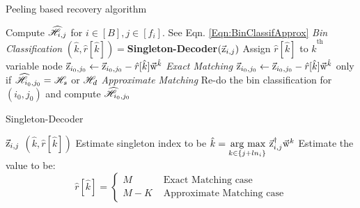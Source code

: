\documentclass[journal,11pt,onecolumn]{IEEEtran}  %
\begin{document}
\def\gap{4pt}
\begin{algorithm}[h!]
\caption{Peeling based recovery algorithm}
\label{Algo:decoder}
\begin{algorithmic}
\State Compute $\widehat{\mathscr{H}}_{i,j}$ for $i\in[B], j\in[f_i]$. See Eqn. \eqref{Eqn:BinClassifApprox} \hspace{26.5ex} {\it Bin Classification}
\vspace{\gap}
\vspace{\gap}
  \State $(\hat{k},\hat{r}[\hat{k}])=${\bf Singleton-Decoder}$(\vec{\mathrm{z}}_{i,j})$
\vspace{\gap}
  \State Assign $\hat{r}[\hat{k}]$ to $\hat{k}^{\text{th}}$ variable node
\vspace{1.5\gap}
\vspace{\gap}
	   \State $\vec{\mathrm{z}}_{i_0,j_0}\gets\vec{\mathrm{z}}_{i_0,j_0}-\hat{r}[\hat{k}]\vec{\mathrm{w}}^{\hat{k}}$   \hspace{45.5ex} {\it Exact Matching}
	   \vspace{\gap}
	   \State $\vec{\mathrm{z}}_{i_0,j_0}\gets\vec{\mathrm{z}}_{i_0,j_0}-\hat{r}[\hat{k}]\vec{\mathrm{w}}^{\hat{k}}$   \hspace{6ex} only if $\widehat{\mathscr{H}}_{i_0,j_0}=\mathscr{H}_s$ or $\mathscr{H}_d$ \hspace{14ex} {\it Approximate Matching}
	   \vspace{\gap}
	   \State Re-do the bin classification for $(i_0,j_0)$ and compute $\widehat{\mathscr{H}}_{i_0,j_0}$
      \EndFor
\EndWhile
\end{algorithmic}
\end{algorithm}

\begin{algorithm}[h!]
\caption{Singleton-Decoder}
\label{Algo:SingletonDecoder}
\begin{algorithmic}
 $\vec{\mathrm{z}}_{i,j}$
\vspace{\gap}
 $(\hat{k},\hat{r}[\hat{k}])$
\vspace{\gap}
\State Estimate singleton index to be $ \hat{k} = \underset{k\in\{j+l n_i\}}{\operatorname*{\,arg\ max}}\  \vec{\mathrm{z}}^{\dagger}_{i,j} \vec{\mathrm{w}}^{k}$ 
\vspace{\gap}
  \State Estimate the value to be:$$ \hat{r}[\hat{k}]=
   \begin{cases}
   M & \text{ Exact Matching case}\\
  M-K & \text{ Approximate Matching case}
  \end{cases}
  $$
\end{algorithmic}
\end{algorithm}
\end{document}
